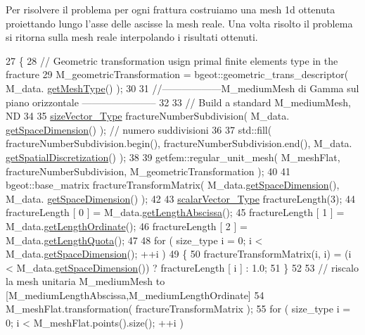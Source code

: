 Per risolvere il problema per ogni frattura costruiamo una mesh 1d ottenuta proiettando lungo l'asse delle ascisse la mesh reale. Una volta risolto il problema si ritorna sulla mesh reale interpolando i risultati ottenuti. 
\begin{DoxyCode}
27 \{
28     \textcolor{comment}{// Geometric transformation usign primal finite elements type in the fracture}
29     M\_geometricTransformation = bgeot::geometric\_trans\_descriptor( M\_data.
      \hyperlink{classFractureData_aaded6c0452470489beb4ab95b5f4158f}{getMeshType}() );
30 
31     \textcolor{comment}{//------------------M\_mediumMesh di Gamma sul piano orizzontale -----------------------}
32 
33     \textcolor{comment}{// Build a standard M\_mediumMesh, ND}
34 
35     \hyperlink{Core_8h_a83c51913d041a5001e8683434c09857f}{sizeVector\_Type} fractureNumberSubdivision( M\_data.
      \hyperlink{classFractureData_a4ead03266295fe14fa3285692f945d89}{getSpaceDimension}() ); \textcolor{comment}{// numero suddivisioni}
36 
37     std::fill( fractureNumberSubdivision.begin(), fractureNumberSubdivision.end(), M\_data.
      \hyperlink{classFractureData_a5c10d579be7849be1a126c24982f8a23}{getSpatialDiscretization}() );
38 
39     getfem::regular\_unit\_mesh( M\_meshFlat, fractureNumberSubdivision, M\_geometricTransformation );
40 
41     bgeot::base\_matrix fractureTransformMatrix( M\_data.\hyperlink{classFractureData_a4ead03266295fe14fa3285692f945d89}{getSpaceDimension}(), M\_data.
      \hyperlink{classFractureData_a4ead03266295fe14fa3285692f945d89}{getSpaceDimension}() );
42 
43     \hyperlink{Core_8h_a4e75b5863535ba1dd79942de2846eff0}{scalarVector\_Type} fractureLength(3);
44     fractureLength [ 0 ] = M\_data.\hyperlink{classFractureData_abaebcf16d83713858e25837939ad3161}{getLengthAbscissa}();
45     fractureLength [ 1 ] = M\_data.\hyperlink{classFractureData_a905e953f685b1329ddcc7ee56f8302b1}{getLengthOrdinate}();
46     fractureLength [ 2 ] = M\_data.\hyperlink{classFractureData_a79747fff53da9d858950d83ad0114288}{getLengthQuota}();
47 
48     \textcolor{keywordflow}{for} ( size\_type i = 0; i < M\_data.\hyperlink{classFractureData_a4ead03266295fe14fa3285692f945d89}{getSpaceDimension}(); ++i )
49     \{
50         fractureTransformMatrix(i, i) = (i < M\_data.\hyperlink{classFractureData_a4ead03266295fe14fa3285692f945d89}{getSpaceDimension}()) ? fractureLength 
      [ i ] : 1.0;
51     \}
52 
53     \textcolor{comment}{// riscalo la mesh unitaria M\_mediumMesh to [M\_mediumLengthAbscissa,M\_mediumLengthOrdinate]}
54     M\_meshFlat.transformation( fractureTransformMatrix );
55     \textcolor{keywordflow}{for} ( size\_type i = 0; i < M\_meshFlat.points().size(); ++i )

\end{DoxyCode}
